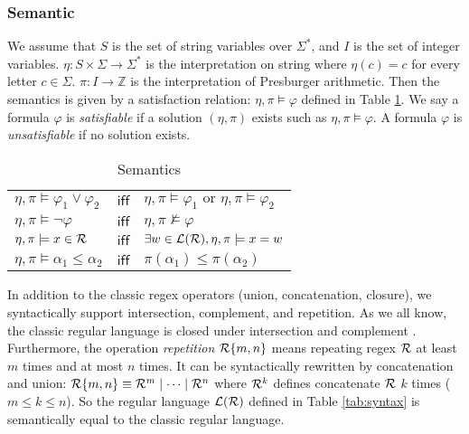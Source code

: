 \documentclass{standalone}
\begin{document}
\subsubsection{Semantic}
We assume that $S$ is the set of string variables over $\Sigma^*$, and $I$ is the set of integer variables. $\eta: S\times\Sigma\rightarrow\Sigma^*$ is the interpretation on string where $\eta(c)=c$ for every letter $c\in \Sigma$. $\pi: I\rightarrow\mathbb{Z}$ is the interpretation of Presburger arithmetic. Then the semantics is given by a satisfaction relation: $\eta, \pi\models \varphi$ defined in Table \ref{tab:semantics}. We say a formula $\varphi$ is \emph{satisfiable} if a solution $(\eta, \pi)$ exists such as $\eta, \pi\models \varphi$. A formula $\varphi$ is \emph{unsatisfiable} if no solution exists.
\begin{table}[h]
  \centering
  \begin{tabular}{lcl}
    $\eta,\pi \models \varphi_1\vee \varphi_2$ & $\mathsf{iff}$ & $\eta,\pi \models \varphi_1 \text{ or } \eta,\pi \models \varphi_2$ \\
    $\eta,\pi \models \neg\varphi $            & $\mathsf{iff}$ & $\eta,\pi \not\models \varphi$                                      \\
    $\eta, \pi \models x\in \mathcal{R}$            & $\mathsf{iff}$ & $\exists w \in \mathcal{L}(\mathcal{R}),\eta,\pi \models x = w$                 \\
    $\eta, \pi \models \alpha_1 \leq \alpha_2$ & $\mathsf{iff}$ & $\pi(\alpha_1) \leq \pi(\alpha_2) $                                 \\
  \end{tabular}
  \caption{Semantics}
  \label{tab:semantics}
\end{table}
In addition to the classic regex operators (union, concatenation, closure), we syntactically support intersection, complement, and repetition. As we all know, the classic regular language is closed under intersection and complement \cite{aut_hopcraft}. Furthermore, the operation \emph{repetition} $\mathcal{R}\{m,n\}$ means repeating regex $\mathcal{R}$ at least $m$ times and at most $n$ times. It can be syntactically rewritten by concatenation and union:
$\mathcal{R}\{m,n\} \equiv \mathcal{R}^m\mid\cdots\mid\mathcal{R}^n$ where $\mathcal{R}^k$ defines concatenate $\mathcal{R}$ $k$ times ($m\leq k\leq n$). So the regular language $\mathcal{L}(\mathcal{R})$ defined in Table \ref{tab:syntax} is semantically equal to the classic regular language.
\end{document}
